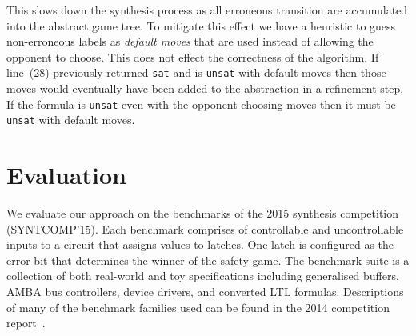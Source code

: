 \documentclass{llncs}
\begin{document}
This slows down the synthesis process as all erroneous transition are
accumulated into the abstract game tree. To mitigate this effect we have a
heuristic to guess non-erroneous labels as \emph{default moves} that are used
instead of allowing the opponent to choose. This does not effect the
correctness of the algorithm. If line~(28) previously returned \texttt{sat} and
is \texttt{unsat} with default moves then those moves would eventually have
been added to the abstraction in a refinement step. If the formula is
\texttt{unsat} even with the opponent choosing moves then it must be
\texttt{unsat} with default moves.

\section{Evaluation}

We evaluate our approach on the benchmarks of the 2015 synthesis competition
(SYNTCOMP'15). Each benchmark comprises of controllable and uncontrollable
inputs to a circuit that assigns values to latches. One latch is configured as
the error bit that determines the winner of the safety game. The benchmark
suite is a collection of both real-world and toy specifications including
generalised buffers, AMBA bus controllers, device drivers, and converted LTL
formulas.  Descriptions of many of the benchmark families used can be found in
the 2014 competition report~\cite{jacobs2015}. 

\begin{figure}[h]
    \centering
\end{figure}
\end{document}
